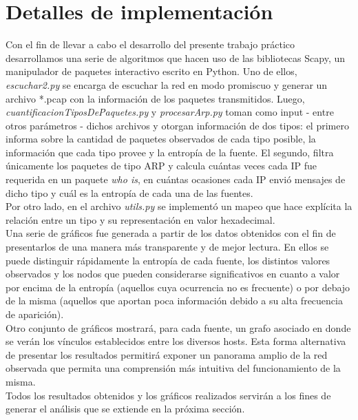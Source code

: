\section{Detalles de implementaci\'on}

Con el fin de llevar a cabo el desarrollo del presente trabajo pr\'actico desarrollamos una serie de algoritmos que hacen uso de las bibliotecas Scapy, un manipulador de paquetes interactivo escrito en Python. Uno de ellos, \textit{escuchar2.py} se encarga de escuchar la red en modo promiscuo y generar un archivo *.pcap con la informaci\'on de los paquetes transmitidos.  Luego, \textit{cuantificacionTiposDePaquetes.py} y \textit{procesarArp.py} toman como input - entre otros par\'ametros - dichos archivos y otorgan informaci\'on de dos tipos: el primero informa sobre la cantidad de paquetes observados de cada tipo posible, la informaci\'on que cada tipo provee y la entrop\'ia de la fuente. El segundo, filtra \'unicamente los paquetes de tipo ARP y calcula cu\'antas veces cada IP fue requerida en un paquete \textit{who is}, en cu\'antas ocasiones cada IP envi\'o mensajes de dicho tipo y cu\'al es la entrop\'ia de cada una de las fuentes. \\
Por otro lado, en el archivo \textit{utils.py} se implement\'o un mapeo que hace expl\'icita la relaci\'on entre un tipo y su representaci\'on en valor hexadecimal. \\

Una serie de gr\'aficos fue generada a partir de los datos obtenidos con el fin de presentarlos de una manera m\'as transparente y de mejor lectura. En ellos se puede distinguir r\'apidamente la entrop\'ia de cada fuente, los distintos valores observados y los nodos que pueden considerarse significativos en cuanto a valor por encima de la entrop\'ia (aquellos cuya ocurrencia no es frecuente) o por debajo de la misma (aquellos que aportan poca informaci\'on debido a su alta frecuencia de aparici\'on).\\
Otro conjunto de gr\'aficos mostrar\'a, para cada fuente, un grafo asociado en donde se ver\'an los v\'inculos establecidos entre los diversos hosts. Esta forma alternativa de presentar los resultados permitir\'a exponer un panorama amplio de la red observada que permita una comprensi\'on m\'as intuitiva del funcionamiento de la misma.\\

Todos los resultados obtenidos y los gr\'aficos realizados servir\'an a los fines de generar el an\'alisis que se extiende en la pr\'oxima secci\'on.
